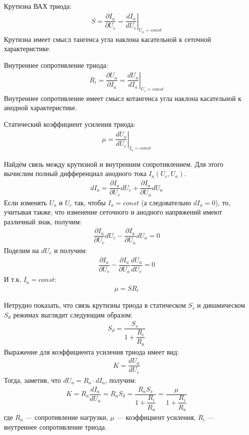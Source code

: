 \documentclass{article}
\begin{document}
Крутизна ВАХ триода:
\begin{gather*}
    S = \dfrac{\partial I_a}{\partial U_c} = \left.\dfrac{dI_a}{dU_c}\right|_{U_a = const}
\end{gather*}
Крутизна имеет смысл тангенса угла наклона касательной к сеточной характеристике.

Внутреннее сопротивление триода:
\begin{gather*}
    R_i = \dfrac{\partial U_a}{\partial I_a} = \left.\dfrac{dU_a}{dI_a}\right|_{U_c = const}
\end{gather*}
Внутреннее сопротивление имеет смысл котангенса угла наклона касательной к анодной характеристике.

Статический коэффициент усиления триода:
\begin{gather*}
    \mu = \left.\dfrac{dU_a}{dU_c}\right|_{I_a = const}
\end{gather*}

Найдём связь между крутизной и внутренним сопротивлением.
Для этого вычислим полный дифференциал анодного тока $I_a(U_c, U_a)$.
\begin{gather*}
    dI_a = \dfrac{\partial I_a}{\partial U_c} dU_c + \dfrac{\partial I_a}{\partial U_a} dU_a
\end{gather*}
Если изменять $U_a$ и $U_c$ так, чтобы $I_a = const$ (а следовательно $dI_a = 0$), то,
учитывая также, что изменение сеточного и анодного напряжений имеют различный знак, получим:
\begin{gather*}
    \dfrac{\partial I_a}{\partial U_c} dU_c - \dfrac{\partial I_a}{\partial U_a} dU_a = 0
\end{gather*}
Поделим на $dU_c$ и получим:
\begin{gather*}
    \dfrac{\partial I_a}{\partial U_c} - \dfrac{\partial I_a}{\partial U_a}\dfrac{dU_a}{dU_c} = 0
\end{gather*}
И т.к. $I_a = const$:
\begin{gather*}
    \mu = S R_i
\end{gather*}

Нетрудно показать, что связь крутизны триода в статическом $S_s$
и динамическом $S_d$ режимах выглядит следующим образом:
\begin{gather*}
    S_d = \dfrac{S_s}{1 + \dfrac{R_i}{R_a}}
\end{gather*}
Выражение для коэффициента усиления триода имеет вид:
\begin{gather*}
    K = \dfrac{dU_a}{dU_c}
\end{gather*}
Тогда, заметив, что $dU_a = R_a \cdot dI_a$, получим:
\begin{gather*}
    K = R_a\dfrac{dI_a}{dU_a} = R_a S_d = \dfrac{R_aS_s}{1 + \dfrac{R_i}{R_a}}
    = \dfrac{\mu}{1 + \dfrac{R_i}{R_a}}
\end{gather*}
где $R_a$ --- сопротивление нагрузки, $\mu$ --- коэффициент усиления,
$R_i$ --- внутреннее сопротивление триода.
\end{document}
